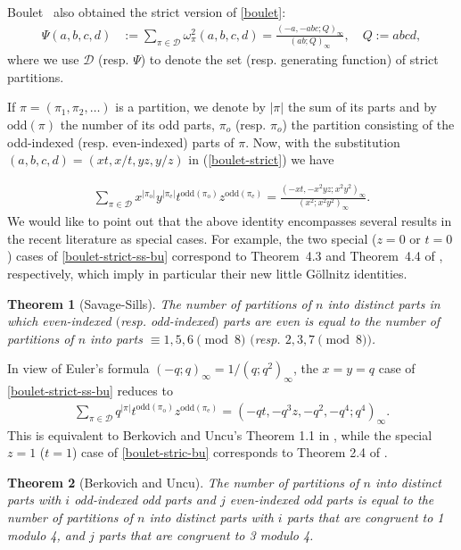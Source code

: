 \documentclass[12pt]{amsart}
\numberwithin{equation}{section}
\theoremstyle{plain}
\newtheorem{theorem}{Theorem}[section]
\theoremstyle{definition}
\def\odd{\mathrm{odd}}
\begin{document}
 Boulet~\cite{bou}  also obtained the strict version of \eqref{boulet}:
\begin{align}\label{boulet-strict}
\Psi(a,b,c,d) &:=\sum_{\pi\in \mathcal{D}} \omega^2_{\pi}(a,b,c,d)=\frac{(-a,-abc;Q)_{\infty}}{(ab;Q)_{\infty}}, \quad Q:=abcd,
\end{align}
where we use $\mathcal{D}$ (resp. $\Psi$)
 to denote the set (resp.  generating function) of strict partitions.

If $\pi=(\pi_1, \pi_2, \ldots)$ is a partition, we denote by $|\pi|$ the sum of its parts and 
by ${\odd}(\pi)$  the number of its odd  parts,
$\pi_o$ (resp. $\pi_o$) the partition consisting of the odd-indexed (resp. even-indexed) parts of $\pi$.  Now, with the substitution $(a,b,c,d)=(xt, x/t, yz, y/z)$ in (\ref{boulet-strict}) we have 


\begin{align}\label{boulet-strict-ss-bu}
\sum_{\pi\in \mathcal{D}} x^{|\pi_\textrm{o}|}y^{|\pi_\textrm{e}|}t^{{\odd}(\pi_\textrm{o})}z^{{\odd}(\pi_\textrm{e})}=\frac{(-xt,-x^2yz;x^2y^2)_{\infty}}{(x^2;x^2y^2)_{\infty}}.
\end{align}
We would like to point out  that  the above identity encompasses 
several  results in the recent literature as special cases.
For example,  the two special ($z=0$ or $t=0$) 
cases of  \eqref{boulet-strict-ss-bu} 
correspond to 
 Theorem~4.3 and Theorem~4.4 of \cite{ss}, respectively, which
  imply in particular their  new little G\"ollnitz identities.
  \begin{theorem}[Savage-Sills]
 The number of partitions of $n$ into distinct parts in which even-indexed $($resp. odd-indexed$)$ parts are even is equal to the number of partitions of $n$ into parts  $\equiv 1,5,6\pmod{8}$ $($resp. $2,3,7\pmod{8}$$)$.
\end{theorem}
 
 In view of 
Euler's formula $(-q;q)_\infty=1/(q;q^2)_\infty$, 
the  $x=y=q$ case of  \eqref{boulet-strict-ss-bu}  reduces to 
\begin{align}\label{boulet-stric-bu}
\sum_{\pi\in \mathcal{D}} q^{|\pi|}t^{{\odd}(\pi_\textrm{o})}z^{{\odd}(\pi_\textrm{e})}=(-qt,-q^3z, -q^2, -q^4;q^4)_{\infty}.
\end{align}
This is  equivalent to Berkovich and Uncu's Theorem 1.1 in \cite{bu2}, while 
the special $z=1$ ($t=1$) case of 
\eqref{boulet-stric-bu} corresponds to  Theorem 2.4 of \cite{bu2}. 
\begin{theorem}[Berkovich and Uncu]\label{bu-2}
The number of partitions of $n$ into distinct parts with $i$ odd-indexed odd parts and $j$
even-indexed odd parts is equal to 
 the number of partitions of $n$ into distinct parts with $i$ parts
that are congruent to 1 modulo 4, and $j$ parts that are congruent to 3 modulo 4.
\end{theorem}
\end{document}
